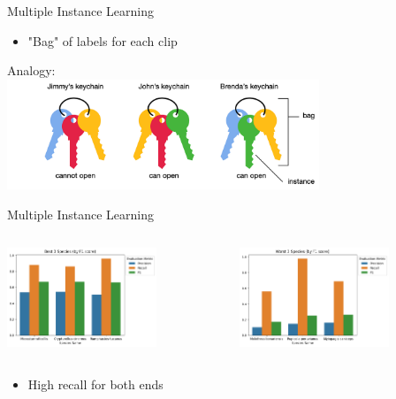 \begin{frame}{Multiple Instance Learning}
    \begin{itemize}
        \item "Bag" of labels for each clip
    \end{itemize}
    Analogy:\\
    \includegraphics[height=0.7\textheight,width=0.7\textwidth,keepaspectratio]{images/keyring_analogy.png}
\end{frame}

\begin{frame}{Multiple Instance Learning}
    \begin{columns}
        \begin{column}{0.5\textwidth}
            \includegraphics[height=1\textheight,width=0.7\textwidth,keepaspectratio]{images/best3species.png}
        \end{column}
        \begin{column}{0.5\textwidth}
            \includegraphics[height=1\textheight,width=0.7\textwidth,keepaspectratio]{images/worst3species.png}
        \end{column}
    \end{columns}
    \begin{itemize}
        \item High recall for both ends
    \end{itemize}
\end{frame}

